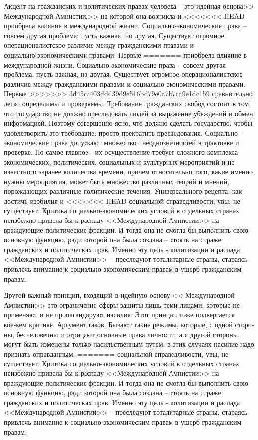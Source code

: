 \documentclass{book}
\begin{document}
{Акцент на гражданских и политических правах человека -- это идейная основа>> Международной Амнистии,>> на которой она возникла и 
<<<<<<< HEAD
приобрела влияние в международной жизни. Социально‑экономические права -- совсем другая проблема; пусть важная, но другая. 
Существует огромное операционалистское различие между гражданскими правами и социально‑экономическими правами. Первые 
=======
приобрела влияние в международной жизни. Социально-экономические права -- совсем другая проблема; пусть важная, но другая. 
Существует огромное операционалистское различие между гражданскими правами и социально-экономическими правами. Первые 
>>>>>>> 3d45c7403ddd39d9e516bd79e0a7b7ca9e1dc159
сравнительно легко опреде­лимы и проверяемы. Требование гражданских свобод состоит в том, что государство не должно преследовать 
людей за выра­жение убеждений и обмен информацией. Поэтому совершенно ясно, что должно сделать государство, чтобы удовлетворить 
это требование: просто прекратить преследования. Социально-экономические права допускают множество  неоднозначно­стей в трактовке 
и проверке. Но самое главное - их осуще­ствление требует сложного комплекса экономических, полити­ческих, социальных и культурных 
мероприятий и не известно­го заранее количества времени, причем относительно того, ка­кие именно нужны мероприятия, может быть 
множество раз­личных теорий и мнений, порождающих различные полити­ческие течения. Универсального рецепта, как достичь изобилия и 
<<<<<<< HEAD
социальной справедливости, увы, не существует. Критика социально‑экономических условий в отдельных странах неиз­бежно привела бы 
к распаду <<Международной Амнистии>> на враждующие политические фракции. И тогда она не смогла бы выполнить свою основную функцию, 
ради которой она была создана -- стоять на страже гражданских и политических прав. Именно эту цель ‑ политизации и распада 
<<Международной Ам­нистии>> -- преследуют тоталитарные страны, стараясь привлечь внимание к социально‑экономическим правам в ущерб граж­данским правам.

Другой важный принцип, входящий в идейную основу << Меж­дународной Амнистии>> это ограничение сферы защиты лишь теми лицами, которые не применяют и не пропагандируют на­силия. Этот принцип тоже подвергается кое‑кем критике. Ар­гумент таков. Бывают такие режимы, которые, с одной сторо­ны, бесчеловечны и отрицают основные права личности, а с другой стороны, могут быть изменены только насильственным путем; в этих случаях насилие надо признать оправданным.
=======
социальной справедливости, увы, не существует. Критика социально-экономических условий в отдельных странах неиз­бежно привела бы 
к распаду <<Международной Амнистии>> на враждующие политические фракции. И тогда она не смогла бы выполнить свою основную функцию, 
ради которой она была создана -- стоять на страже гражданских и политических прав. Именно эту цель - политизации и распада 
<<Международной Ам­нистии>> -- преследуют тоталитарные страны, стараясь привлечь внимание к социально-экономическим правам в ущерб граж­данским правам.

}
\end{document}
